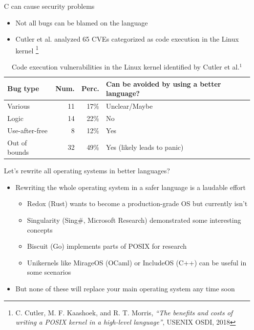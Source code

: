 \documentclass[NET,english,aspectratio=169,notitleframe]{tumbeamer}
\begin{document}
\begin{frame}{C can cause security problems}
\begin{itemize}
\item Not all bugs can be blamed on the language
\item Cutler et al. analyzed 65 CVEs categorized as code execution in the Linux kernel \footnote{C. Cutler, M. F. Kaashoek, and R. T. Morris, \emph{``The benefits and costs of writing a POSIX kernel in a high-level language''}, USENIX OSDI, 2018}
\end{itemize}
\pause
\begin{table}
\centering
\begin{tabular}{ l  r r l }
  \toprule
  Bug type & Num. & Perc. & Can be avoided by using a better language? \\
  \midrule
  Various & 11 & 17\% & Unclear/Maybe \\
  Logic & 14 & 22\% & No \\
  Use-after-free & 8 & 12\% & Yes \\
  Out of bounds & 32 & 49\% & Yes (likely leads to panic) \\
  \bottomrule  
\end{tabular}
\caption{Code execution vulnerabilities in the Linux kernel identified by Cutler et al.$^1$}
\end{table}
\end{frame}


\begin{frame}{Let's rewrite all operating systems in better languages?}
\begin{itemize}
\item Rewriting the whole operating system in a safer language is a laudable effort
\begin{itemize}
\item Redox (Rust) wants to become a production-grade OS but currently isn't
\item Singularity (Sing\#, Microsoft Research) demonstrated some interesting concepts
\item Biscuit (Go) implements parts of POSIX for research
\item Unikernels like MirageOS (OCaml) or IncludeOS (C++) can be useful in some scenarios
\end{itemize}
\pause
\item But none of these will replace your main operating system any time soon
\end{itemize}
\end{frame}
\end{document}
